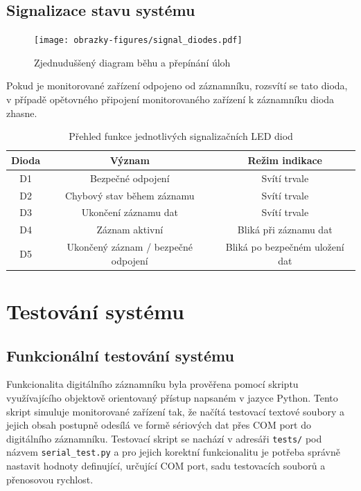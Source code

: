 \section{Signalizace stavu systému}
\label{signalizace_stavu_systemu}

\begin{figure}[h]
    \centering
    \texttt{[image: obrazky-figures/signal\_diodes.pdf]}
    
    \caption{Zjednuduššený diagram běhu a přepínání úloh}
    \label{fig:run-wout-freertos}
\end{figure}

Pokud je monitorované zařízení odpojeno od záznamníku, rozsvítí se tato dioda, v případě opětovného připojení monitorovaného zařízení k záznamníku dioda zhasne.

\begin{table}[h]
    \centering
    \begin{tabular}{|c|c|c|}
        \hline
        \textbf{Dioda} & \textbf{Význam} & \textbf{Režim indikace} \\
        \hline
        D1 & Bezpečné odpojení & Svítí trvale  \\
        \hline
        D2 & Chybový stav během záznamu & Svítí trvale \\
        \hline
        D3 & Ukončení záznamu dat\footnote & Svítí trvale \\
        \hline
        D4 & Záznam aktivní & Bliká při záznamu dat \\
        \hline
        D5 & Ukončený záznam / bezpečné odpojení & Bliká po bezpečném uložení dat \\
        \hline
    \end{tabular}
    \caption{Přehled funkce jednotlivých signalizačních LED diod}
    \label{tab:signal_leds}
\end{table}

\chapter{Testování systému}
\label{testovani_systemu}

\section{Funkcionální testování systému}
Funkcionalita digitálního záznamníku byla prověřena pomocí skriptu využívajícího objektově orientovaný přístup napsaném v jazyce Python. Tento skript simuluje monitorované zařízení tak, že načítá testovací textové soubory a jejich obsah postupně odesílá ve formě sériových dat přes COM port do digitálního záznamníku. Testovací skript se nachází v adresáři \texttt{tests/} pod názvem \texttt{serial\_test.py} a pro jejich korektní funkcionalitu je potřeba správně nastavit hodnoty definující, určující COM port, sadu testovacích souborů a přenosovou rychlost.

